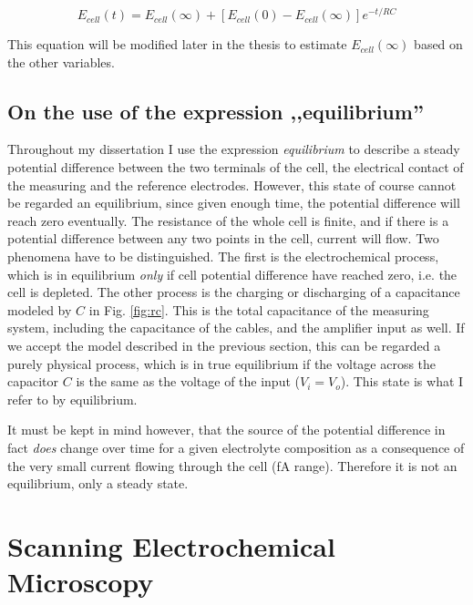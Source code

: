 \begin{equation}
\label{eq:rc}
        E_{cell}(t) = E_{cell}(\infty) + [E_{cell}(0) - E_{cell}(\infty)]e^{-t/RC}
\end{equation}

This equation \cite{lindner1986definition} will be modified later in the thesis to estimate $E_{cell}(\infty)$ based on the other variables.

\subsection{On the use of the expression ,,equilibrium''}
Throughout my dissertation I use the expression \emph{equilibrium} to describe a steady potential difference between the two terminals of the cell, the electrical contact of the measuring and the reference electrodes.
However, this state of course cannot be regarded an equilibrium, since given enough time, the potential difference will reach zero eventually.
The resistance of the whole cell is finite, and if there is a potential difference between any two points in the cell, current will flow.
Two phenomena have to be distinguished.
The first is the electrochemical process, which is in equilibrium \emph{only} if cell potential difference have reached zero, i.e. the cell is depleted.
The other process is the charging or discharging of a capacitance modeled by $C$ in Fig. \ref{fig:rc}.
This is the total capacitance of the measuring system, including the capacitance of the cables, and the amplifier input as well.
If we accept the model described in the previous section, this can be regarded a purely physical process, which is in true equilibrium if the voltage across the capacitor $C$ is the same as the voltage of the input ($V_i = V_o$). This state is what I refer to by equilibrium.

It must be kept in mind however, that the source of the potential difference in fact \emph{does} change over time for a given electrolyte composition as a consequence of the very small current flowing through the cell (fA range). Therefore it is not an equilibrium, only a steady state.
\newpage
\section{Scanning Electrochemical Microscopy}
